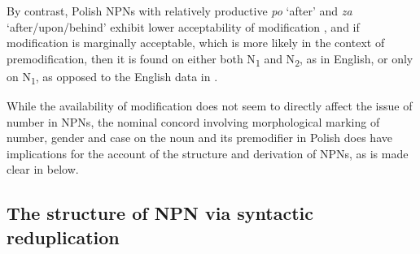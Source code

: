 \documentclass[output=paper]{langscibook}
\begin{document}
\noindent By contrast, Polish NPNs with relatively productive \textit{po} ‘after’ and \textit{za} ‘af\-ter/up\-on/be\-hind’ exhibit lower acceptability of modification , and if modification is marginally acceptable, which is more likely in the context of premodification, then it is found on either both N\textsubscript{1} and N\textsubscript{2}, as in English, or only on N\textsubscript{1}, as opposed to the English data in .

\ea \label{psk:ex:key:12}  
\z
\z

\noindent While the availability of modification does not seem to directly affect the issue of number in NPNs, the nominal concord involving morphological marking of number, gender and case on the noun and its premodifier in Polish does have implications for the account of the structure and derivation of NPNs, as is made clear in  below.

\subsection{The structure of NPN via syntactic reduplication}\label{psk:sec:sec-2-4}
\end{document}
